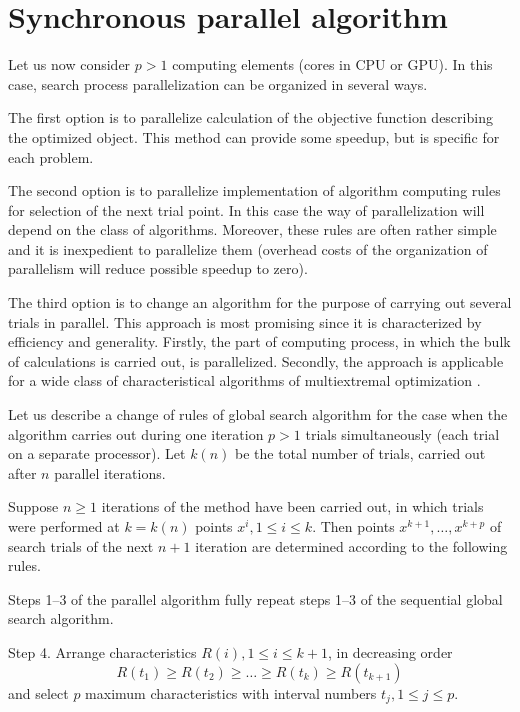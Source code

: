 \documentclass[smallcondensed]{svjour3}     %
\begin{document}
\section{Synchronous parallel algorithm} \label{sec:3}

Let us now consider $p>1$ computing elements (cores in CPU or GPU). In this case, search process parallelization can be organized in several ways.

The first option is to parallelize calculation of the objective function describing the optimized object. This method can provide some speedup, but is specific for each problem.

The second option is to parallelize implementation of algorithm computing rules for selection of the next trial point. In this case the way of parallelization will depend on the class of algorithms. Moreover, these rules are often rather simple and it is inexpedient to parallelize them (overhead costs of the organization of parallelism will reduce possible speedup to zero).

The third option is to change an algorithm for the purpose of carrying out several trials in parallel. This approach is most promising since it is characterized by efficiency and generality. Firstly, the part of computing process, in which the bulk of calculations is carried out, is parallelized. Secondly, the approach is applicable for a wide class of characteristical algorithms of multiextremal optimization \cite{RefSergeyev1994,RefSergeyevGrishagin,RefGrishagin1997,RefGrishagin2001}.

Let us describe a change of rules of global search algorithm for the case when the algorithm carries out during one iteration $p>1$ trials simultaneously (each trial on a separate processor). Let $k(n)$ be the total number of trials, carried out after $n$ parallel iterations.

Suppose $n\geq 1$  iterations of the method have been carried out, in which trials were performed at $k=k(n)$ points $x^i,1\leq i \leq k$. Then points $x^{k+1},\dots,x^{k+p}$  of search trials of the next $n+1$ iteration are determined according to the following rules.

Steps 1--3 of the parallel algorithm fully repeat steps 1--3 of the sequential global search algorithm.

Step 4. Arrange characteristics  $R(i), 1 \leq i \leq k+1$, in decreasing order 
\begin{equation}\label{eq:21}
R(t_1)\geq R(t_2)\geq \dots \geq R(t_{k}) \geq R(t_{k+1})
\end{equation}
and select $p$ maximum characteristics with interval numbers $t_j, 1\leq j \leq p$.
\end{document}
